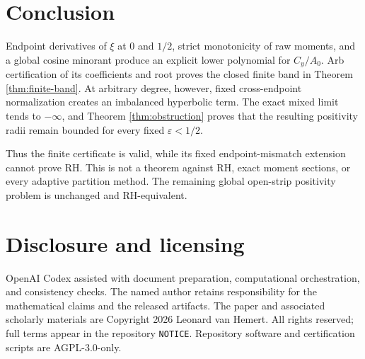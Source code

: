 \documentclass[11pt]{amsart}
\theoremstyle{remark}
\begin{document}
\section{Conclusion}

Endpoint derivatives of $\xi$ at $0$ and $1/2$, strict monotonicity of raw
moments, and a global cosine minorant produce an explicit lower polynomial for
$C_y/A_0$.  Arb certification of its coefficients and root proves the closed
finite band in Theorem \ref{thm:finite-band}.  At arbitrary degree, however,
fixed cross-endpoint normalization creates an imbalanced hyperbolic term.
The exact mixed limit tends to $-\infty$, and Theorem
\ref{thm:obstruction} proves that the resulting positivity radii remain
bounded for every fixed $\varepsilon<1/2$.

Thus the finite certificate is valid, while its fixed endpoint-mismatch
extension cannot prove RH.  This is not a theorem against RH, exact moment
sections, or every adaptive partition method.  The remaining global
open-strip positivity problem is unchanged and RH-equivalent.

\section*{Disclosure and licensing}

OpenAI Codex assisted with document preparation, computational orchestration,
and consistency checks.  The named author retains responsibility for the
mathematical claims and the released artifacts.  The paper and associated
scholarly materials are Copyright \textcopyright{} 2026 Leonard van Hemert.
All rights reserved; full terms appear in the repository \texttt{NOTICE}.
Repository software and certification scripts are AGPL-3.0-only.
\end{document}

